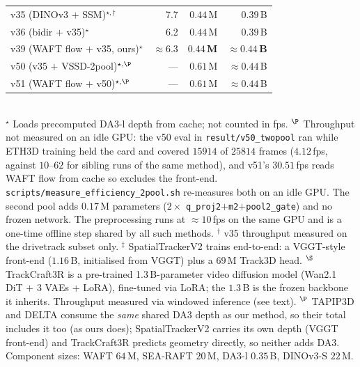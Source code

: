 \documentclass[11pt,a4paper]{article}
\begin{document}
\begin{table}[h]
\begin{tabular}{lrrr}
v35 (DINOv3 $+$ SSM)$^{\star,\dagger}$   & 7.7             & $0.44$\,M & $0.39$\,B \\
v36 (bidir $+$ v35)$^{\star}$            & 6.2             & $0.44$\,M & $0.39$\,B \\
v39 (WAFT flow $+$ v35, ours)$^{\star}$  & ${\approx}6.3$  & $\mathbf{0.44}$\,\textbf{M} & ${\approx}\mathbf{0.44}$\,\textbf{B} \\
v50 (v35 $+$ VSSD-2pool)$^{\star,\P}$   & ---             & $0.61$\,M & ${\approx}0.44$\,B \\
v51 (WAFT flow $+$ v50)$^{\star,\P}$    & ---             & $0.61$\,M & ${\approx}0.44$\,B \\
\bottomrule
\end{tabular}
\\[2pt]
{\footnotesize
$^{\star}$ Loads precomputed DA3-l depth from cache; not counted in fps.
$^{\P}$ Throughput not measured on an idle GPU: the v50 eval in \texttt{result/v50\_twopool} ran while ETH3D training held the card and covered $15914$ of $25814$ frames ($4.12$\,fps, against $10$--$62$ for sibling runs of the same method), and v51's $30.51$\,fps reads WAFT flow from cache so excludes the front-end. \texttt{scripts/measure\_efficiency\_2pool.sh} re-measures both on an idle GPU. The second pool adds $0.17$\,M parameters ($2\times$ \texttt{q\_proj2}$+$\texttt{m2}$+$\texttt{pool2\_gate}) and no frozen network.
The preprocessing runs at ${\approx}10$\,fps on the same GPU and is a one-time
offline step shared by all such methods.
$^{\dagger}$ v35 throughput measured on the drivetrack subset only.
$^{\ddagger}$ SpatialTrackerV2 trains end-to-end: a VGGT-style front-end ($1.16$\,B, initialised
from VGGT) plus a $69$\,M Track3D head.
$^{\S}$ TrackCraft3R is a pre-trained 1.3\,B-parameter video diffusion model (Wan2.1
DiT $+$ 3 VAEs $+$ LoRA), fine-tuned via LoRA; the $1.3$\,B is the frozen backbone it inherits.
Throughput measured via windowed inference (see text).
$^{\P}$ TAPIP3D and DELTA consume the \emph{same} shared DA3 depth as our method, so their total includes it
too (as ours does); SpatialTrackerV2 carries its own depth (VGGT front-end) and TrackCraft3R predicts
geometry directly, so neither adds DA3.
Component sizes: WAFT $64$\,M, SEA-RAFT $20$\,M, DA3-l $0.35$\,B, DINOv3-S $22$\,M.}
\end{table}
\end{document}
